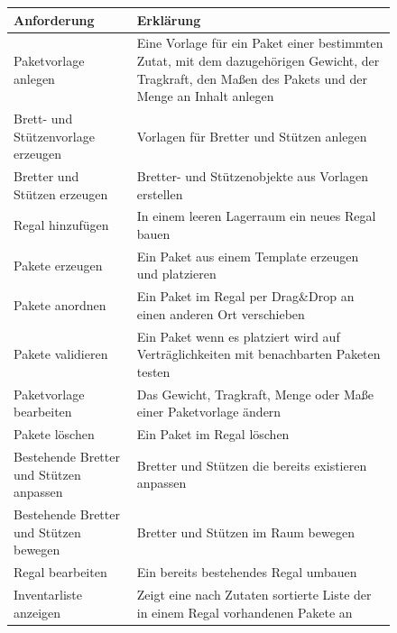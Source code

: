 \begin{figure}[H]
    \label{fig:funktionaleAnforderungenTabelle}
    \begin{longtable}{|m{}|m{}|}
        \hline
        \textbf{Anforderung} & \textbf{Erklärung} \\
        \hline
        Paketvorlage anlegen & Eine Vorlage für ein Paket einer bestimmten Zutat, mit dem dazugehörigen Gewicht, der Tragkraft, den Maßen des Pakets und der Menge an Inhalt anlegen \\
        \hline
        Brett- und Stützenvorlage erzeugen & Vorlagen für Bretter und Stützen anlegen \\
        \hline
        Bretter und Stützen erzeugen & Bretter- und Stützenobjekte aus Vorlagen erstellen \\
        \hline
        Regal hinzufügen & In einem leeren Lagerraum ein neues Regal bauen \\
        \hline
        Pakete erzeugen & Ein Paket aus einem Template erzeugen und platzieren \\
        \hline
        Pakete anordnen & Ein Paket im Regal per Drag\&Drop an einen anderen Ort verschieben \\
        \hline
        Pakete validieren & Ein Paket wenn es platziert wird auf Verträglichkeiten mit benachbarten Paketen testen \\
        \hline
        Paketvorlage bearbeiten & Das Gewicht, Tragkraft, Menge oder Maße einer Paketvorlage ändern \\
        \hline
        Pakete löschen & Ein Paket im Regal löschen \\
        \hline
        Bestehende Bretter und Stützen anpassen & Bretter und Stützen die bereits existieren anpassen \\
        \hline
        Bestehende Bretter und Stützen bewegen & Bretter und Stützen im Raum bewegen \\
        \hline
        Regal bearbeiten & Ein bereits bestehendes Regal umbauen \\
        \hline
        Inventarliste anzeigen & Zeigt eine nach Zutaten sortierte Liste der in einem Regal vorhandenen Pakete an \\
        \hline
    \end{longtable}
\end{figure}

